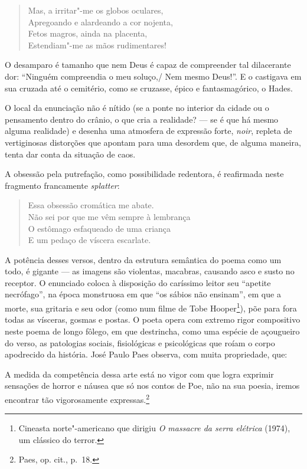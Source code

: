 \begin{verse}
Mas, a irritar"-me os globos oculares,\\
Apregoando e alardeando a cor nojenta,\\
Fetos magros, ainda na placenta,\\
Estendiam"-me as mãos rudimentares!
\end{verse}

O desamparo é tamanho que nem Deus é capaz de compreender tal
dilacerante dor: “Ninguém compreendia o meu soluço,/ Nem mesmo Deus!”.
E o castigava em sua cruzada até o cemitério, como se cruzasse, épico e
fantasmagórico, o Hades.

O local da enunciação não é nítido (se a ponte no interior da cidade
ou o pensamento dentro do crânio, o que cria a realidade? --- se é que há
mesmo alguma realidade) e desenha uma atmosfera de expressão forte,
\textit{noir}, repleta de vertiginosas distorções que apontam para uma
desordem que, de alguma maneira, tenta dar conta da situação de caos. 

A obsessão pela putrefação, como possibilidade redentora, é
reafirmada neste fragmento francamente \textit{splatter}:		%

\begin{verse}
Essa obsessão cromática me abate.\\
Não sei por que me vêm sempre à lembrança\\
O estômago esfaqueado de uma criança\\
E um pedaço de víscera escarlate.
\end{verse}

A potência desses versos, dentro da estrutura semântica do poema
como um todo, é gigante --- as imagens são violentas, macabras, causando
asco e susto no receptor. O enunciado coloca à disposição do caríssimo
leitor seu “apetite necrófago”, na época monstruosa em que “os sábios
não ensinam”, em que a morte, sua gritaria e seu odor (como num filme
de Tobe Hooper\footnote{ Cineasta norte"-americano que dirigiu \textit{O
massacre da serra elétrica} (1974), um clássico do terror.}), põe para
fora todas as vísceras, gosmas e postas. O poeta opera com extremo
rigor compositivo neste poema de longo fôlego, em que destrincha, como
uma espécie de açougueiro do verso, as patologias sociais, fisiológicas
e psicológicas que roíam o corpo apodrecido da história. José Paulo
Paes observa, com muita propriedade, que:

\begin{hedraquote}
A medida da competência dessa arte está no vigor com que logra exprimir
sensações de horror e náusea que só nos contos de Poe, não na sua
poesia, iremos encontrar tão vigorosamente expressas.\footnote{Paes, op. cit., p.~18.}
\end{hedraquote}

